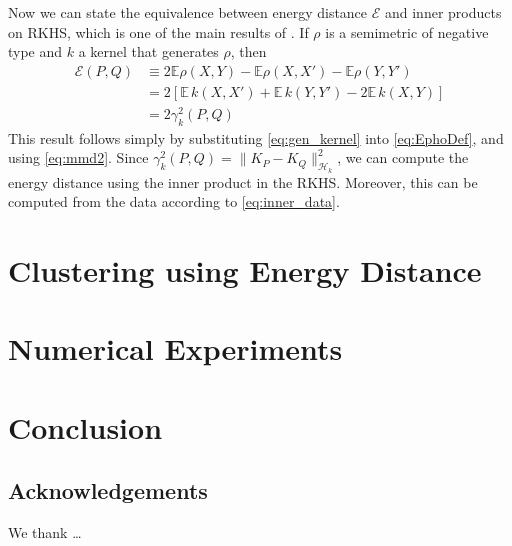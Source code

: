\documentclass[aps,preprint,nofootinbib,floatfix]{revtex4-1}
\def\Energy{\mathcal{E}}
\def\E{\mathbb{E}}
\begin{document}
Now we can state the equivalence between energy distance $\Energy$ and
inner products on RKHS, which is one of the main results of
\cite{Sejdinovic2013}. If $\rho$ is a semimetric
of negative type and $k$ a kernel that generates $\rho$, then
\begin{align}
\Energy(P, Q) &\equiv 2\E \rho(X,Y) - \E \rho(X,X') - \E \rho(Y,Y') 
\label{eq:EphoDef}\\
&= 2 \left[ \E \, k(X, X') + \E \, k(Y, Y') - 2\E \, k(X, Y)\right] \\
&=2 \gamma_k^2(P,Q) 
\end{align}
This result follows simply by substituting \eqref{eq:gen_kernel} into
\eqref{eq:EphoDef}, and using \eqref{eq:mmd2}.
Since $\gamma_k^2(P, Q) = \| K_P - K_Q \|^2_{\mathcal{H}_k}$, we
can compute the energy distance using the inner product in the RKHS. Moreover,
this can be computed from the data according to \eqref{eq:inner_data}.


\section{Clustering using Energy Distance}





\section{Numerical Experiments}

\section{Conclusion}


\subsection*{Acknowledgements}
We thank \ldots




\end{document}
